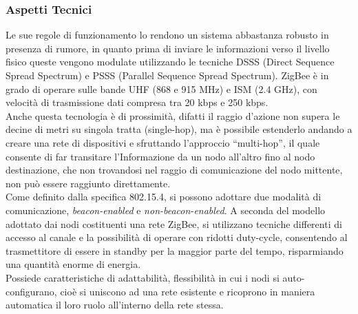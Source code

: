\subsubsection{Aspetti Tecnici}
Le sue regole di funzionamento lo rendono un sistema abbastanza robusto in presenza di rumore, in quanto prima di inviare le informazioni verso il livello fisico queste vengono modulate utilizzando le tecniche DSSS (Direct Sequence Spread Spectrum) e PSSS (Parallel Sequence Spread Spectrum). %
ZigBee è in grado di operare sulle bande UHF (868 e 915 MHz) e ISM (2.4 GHz), con velocità di trasmissione dati compresa tra 20 kbps e 250 kbps.\\ %
Anche questa tecnologia è di prossimità, difatti il raggio d'azione non supera le decine di metri su singola tratta (single-hop), ma è possibile estenderlo andando a creare una rete di dispositivi e sfruttando l'approccio ``multi-hop'', il quale consente di far transitare l'Informazione da un nodo all'altro fino al nodo destinazione, che non trovandosi nel raggio di comunicazione del nodo mittente, non può essere raggiunto direttamente.\\
Come definito dalla specifica 802.15.4, si possono adottare due modalità di comunicazione, \textit{beacon-enabled} e \textit{non-beacon-enabled}. A seconda del modello adottato dai nodi costituenti una rete ZigBee, si utilizzano tecniche differenti di accesso al canale e la possibilità di operare con ridotti duty-cycle, consentendo al trasmettitore di essere in standby per la maggior parte del tempo, risparmiando una quantità enorme di energia.\\
Possiede caratteristiche di adattabilità, flessibilità in cui i nodi si auto-configurano, cioè si uniscono ad una rete esistente e ricoprono in maniera automatica il loro ruolo all'interno della rete stessa.

